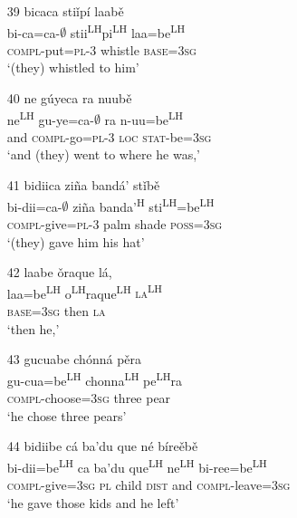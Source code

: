 \begin{itemize}
\item[39]
\glll bicaca sti\v{i}p\'{i} laab\v{e}\\
bi-ca=ca-$\emptyset$ stii\textsuperscript{LH}pi\textsuperscript{LH} laa=be\textsuperscript{LH}\\
\textsc{compl}-put=\textsc{pl}-\textsc{3} whistle \textsc{base}=\textsc{3sg}\\
\glt `(they) whistled to him'


\item[40]
\glll ne g\'{u}yeca ra nuub\v{e}\\
ne\textsuperscript{LH} gu-ye=ca-$\emptyset$ ra n-uu=be\textsuperscript{LH}\\
and \textsc{compl}-go=\textsc{pl}-\textsc{3} \textsc{loc} \textsc{stat}-be=\textsc{3sg}\\
\glt `and (they) went to where he was,'
 

\item[41]
\glll bidiica zi\~{n}a band\'{a}' st\v{i}b\v{e}\\
bi-dii=ca-$\emptyset$ zi\~{n}a banda'\textsuperscript{H} sti\textsuperscript{LH}=be\textsuperscript{LH}\\
\textsc{compl}-give=\textsc{pl}-\textsc{3} palm shade \textsc{poss}=\textsc{3sg}\\
\glt `(they) gave him his hat'


\item[42]
\glll laabe \v{o}raque l\'{a},\\
laa=be\textsuperscript{LH} o\textsuperscript{LH}raque\textsuperscript{LH} \textsc{la\textsuperscript{LH}}\\
\textsc{base}=\textsc{3sg} then \textsc{la}\\
\glt `then he,'


\item[43]
\glll gucuabe ch\'{o}nn\'{a} p\v{e}ra\\
gu-cua=be\textsuperscript{LH} chonna\textsuperscript{LH} pe\textsuperscript{LH}ra\\
\textsc{compl}-choose=\textsc{3sg} three pear\\
\glt `he chose three pears'


\item[44]
\glll bidiibe c\'{a} ba'du que n\'{e} b\'{i}re\v{e}b\v{e}\\
bi-dii=be\textsuperscript{LH}  ca ba'du que\textsuperscript{LH}  ne\textsuperscript{LH}  bi-ree=be\textsuperscript{LH} \\
\textsc{compl}-give=\textsc{3sg} \textsc{pl} child \textsc{dist} and \textsc{compl}-leave=\textsc{3sg}\\
\glt `he gave those kids and he left'



\end{itemize}
